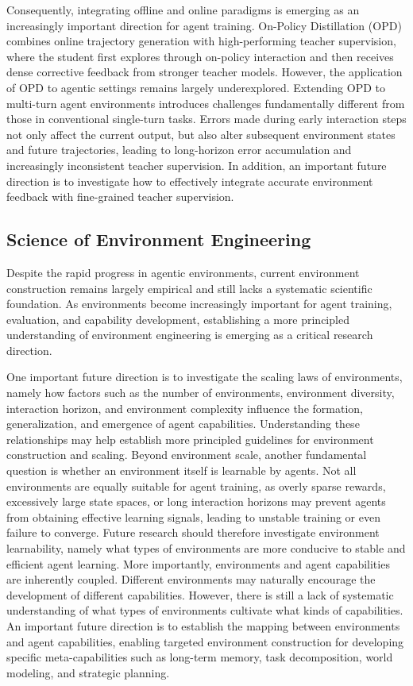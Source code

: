 Consequently, integrating offline and online paradigms is emerging as an increasingly important direction for agent training.
On-Policy Distillation (OPD) \cite{OPD} combines online trajectory generation with high-performing teacher supervision, where the student first explores through on-policy interaction and then receives dense corrective feedback from stronger teacher models.
However, the application of OPD to agentic settings remains largely underexplored.
Extending OPD to multi-turn agent environments introduces challenges fundamentally different from those in conventional single-turn tasks.
Errors made during early interaction steps not only affect the current output, but also alter subsequent environment states and future trajectories, leading to long-horizon error accumulation and increasingly inconsistent teacher supervision.
In addition, an important future direction is to investigate how to effectively integrate accurate environment feedback with fine-grained teacher supervision.


\subsection{Science of Environment Engineering}

Despite the rapid progress in agentic environments, current environment construction remains largely empirical and still lacks a systematic scientific foundation.
As environments become increasingly important for agent training, evaluation, and capability development, establishing a more principled understanding of environment engineering is emerging as a critical research direction.

One important future direction is to investigate the scaling laws of environments, namely how factors such as the number of environments, environment diversity, interaction horizon, and environment complexity influence the formation, generalization, and emergence of agent capabilities.
Understanding these relationships may help establish more principled guidelines for environment construction and scaling.
Beyond environment scale, another fundamental question is whether an environment itself is learnable by agents.
Not all environments are equally suitable for agent training, as overly sparse rewards, excessively large state spaces, or long interaction horizons may prevent agents from obtaining effective learning signals, leading to unstable training or even failure to converge.
Future research should therefore investigate environment learnability, namely what types of environments are more conducive to stable and efficient agent learning.
More importantly, environments and agent capabilities are inherently coupled.
Different environments may naturally encourage the development of different capabilities.
However, there is still a lack of systematic understanding of what types of environments cultivate what kinds of capabilities.
An important future direction is to establish the mapping between environments and agent capabilities, enabling targeted environment construction for developing specific meta-capabilities such as long-term memory, task decomposition, world modeling, and strategic planning.

